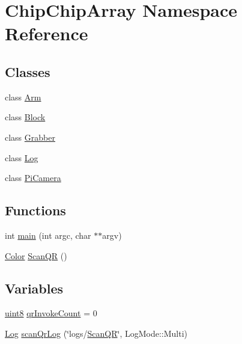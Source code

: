 \hypertarget{namespaceChipChipArray}{\section{Chip\+Chip\+Array Namespace Reference}
\label{namespaceChipChipArray}
}
\subsection*{Classes}
\begin{DoxyCompactItemize}
\item 
class \hyperlink{classChipChipArray_1_1Arm}{Arm}
\item 
class \hyperlink{classChipChipArray_1_1Block}{Block}
\item 
class \hyperlink{classChipChipArray_1_1Grabber}{Grabber}
\item 
class \hyperlink{classChipChipArray_1_1Log}{Log}
\item 
class \hyperlink{classChipChipArray_1_1PiCamera}{Pi\+Camera}
\end{DoxyCompactItemize}
\subsection*{Functions}
\begin{DoxyCompactItemize}
\item 
int \hyperlink{namespaceChipChipArray_a7fc3d1edffca11531cd09fdab7c8b88d}{main} (int argc, char $\ast$$\ast$argv)
\item 
\hyperlink{definitions_8hpp_abc05a0f46084a3477cf5d5c939ff1436}{Color} \hyperlink{namespaceChipChipArray_a6c7465049b5d408e1a238b6d8ffa887d}{Scan\+Q\+R} ()
\end{DoxyCompactItemize}
\subsection*{Variables}
\begin{DoxyCompactItemize}
\item 
\hyperlink{definitions_8hpp_adde6aaee8457bee49c2a92621fe22b79}{uint8} \hyperlink{namespaceChipChipArray_a3b2a3c0ffa9f53021293aeb4955d2fef}{qr\+Invoke\+Count} = 0
\item 
\hyperlink{classChipChipArray_1_1Log}{Log} \hyperlink{namespaceChipChipArray_ab5c6290951637c25a5422707020fb3a8}{scan\+Qr\+Log} (\char`\"{}logs/\hyperlink{namespaceChipChipArray_a6c7465049b5d408e1a238b6d8ffa887d}{Scan\+Q\+R}\char`\"{}, Log\+Mode\+::\+Multi)
\end{DoxyCompactItemize}


